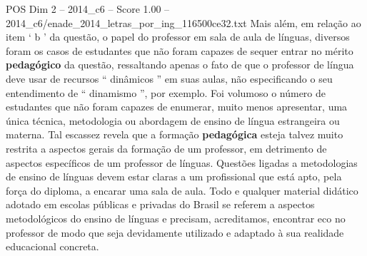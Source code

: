 \begin{textsample}{POS Dim 2 – 2014\_c6 – Score 1.00 – 2014\_c6/enade\_2014\_letras\_por\_ing\_116500ce32.txt}
Mais além, em relação ao item ‘ b ’ da questão, o papel do professor em sala de aula de línguas, diversos foram os casos de estudantes que não foram capazes de sequer entrar no mérito \textbf{pedagógico} da questão, ressaltando apenas o fato de que o professor de língua deve usar de recursos “ dinâmicos ” em suas aulas, não especificando o seu entendimento de “ dinamismo ”, por exemplo.
Foi volumoso o número de estudantes que não foram capazes de enumerar, muito menos apresentar, uma única técnica, metodologia ou abordagem de ensino de língua estrangeira ou materna.
Tal escassez revela que a formação \textbf{pedagógica} esteja talvez muito restrita a aspectos gerais da formação de um professor, em detrimento de aspectos específicos de um professor de línguas.
Questões ligadas a metodologias de ensino de línguas devem estar claras a um profissional que está apto, pela força do diploma, a encarar uma sala de aula.
Todo e qualquer material didático adotado em escolas públicas e privadas do Brasil se referem a aspectos metodológicos do ensino de línguas e precisam, acreditamos, encontrar eco no professor de modo que seja devidamente utilizado e adaptado à sua realidade educacional concreta.

\end{textsample}
